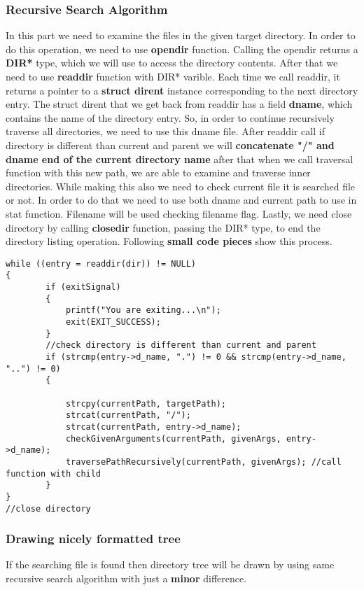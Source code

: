 \documentclass{article}
\begin{document}
\subsubsection{Recursive Search Algorithm}
In this part we need to examine the files in the given target directory. In order to do this operation, we need to use \textbf{opendir} function.
Calling the opendir returns a \textbf{DIR*} type, which we will use to access the directory contents. After that we need to use \textbf{readdir} function with DIR* varible. Each time we call readdir, it returns a pointer to a \textbf{struct dirent} instance corresponding to the next directory entry.
The struct dirent that we get back from readdir has a field \textbf{d\textunderscore name}, which contains the name of the directory entry. So, in order to continue recursively traverse all directories, we need to use this d\textunderscore name file. After readdir call if directory is different than current and parent we will \textbf{concatenate "/" and d\textunderscore name end of the current directory name} after that when we call traversal function with this new path, we are able to examine and traverse inner directories. While making this also we need to check current file it is searched file or not. In order to do that we need to use  both d\textunderscore name and current path to use in stat function. Filename will be used checking filename flag. Lastly, we need close directory by calling \textbf{closedir} function, passing the DIR* type, to end the directory listing operation. Following \textbf{small code pieces} show this process.
\begin{lstlisting}[style=CStyle]
while ((entry = readdir(dir)) != NULL)
{
    	if (exitSignal)
        {
            printf("You are exiting...\n");
            exit(EXIT_SUCCESS);
        }
        //check directory is different than current and parent
        if (strcmp(entry->d_name, ".") != 0 && strcmp(entry->d_name, "..") != 0)
        {

            strcpy(currentPath, targetPath);
            strcat(currentPath, "/");
            strcat(currentPath, entry->d_name);
            checkGivenArguments(currentPath, givenArgs, entry->d_name);
            traversePathRecursively(currentPath, givenArgs); //call function with child
        }
}
//close directory
\end{lstlisting}

\subsubsection{Drawing nicely formatted tree}
If the searching file is found then directory tree will be drawn by using same recursive search algorithm with just a \textbf{minor} difference. 
\end{document}
